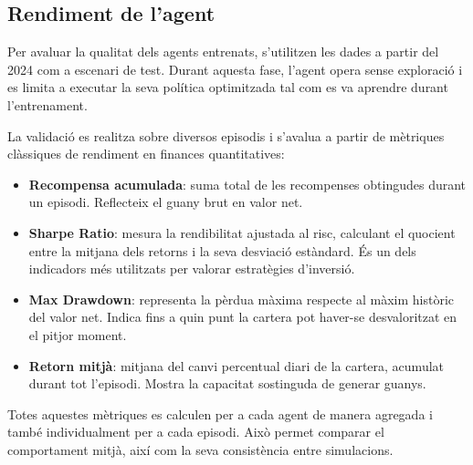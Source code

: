 \documentclass[12pt,a4paper,twoside]{book}
\begin{document}
\subsection{Rendiment de l'agent}

Per avaluar la qualitat dels agents entrenats, s'utilitzen les dades a partir del 2024 com a escenari de test. Durant aquesta fase, l'agent opera sense exploració i es limita a executar la seva política optimitzada tal com es va aprendre durant l'entrenament.

La validació es realitza sobre diversos episodis i s'avalua a partir de mètriques clàssiques de rendiment en finances quantitatives:

\begin{itemize}
    \item \textbf{Recompensa acumulada}: suma total de les recompenses obtingudes durant un episodi. Reflecteix el guany brut en valor net.

    \item \textbf{Sharpe Ratio}: mesura la rendibilitat ajustada al risc, calculant el quocient entre la mitjana dels retorns i la seva desviació estàndard. És un dels indicadors més utilitzats per valorar estratègies d'inversió.

    \item \textbf{Max Drawdown}: representa la pèrdua màxima respecte al màxim històric del valor net. Indica fins a quin punt la cartera pot haver-se desvaloritzat en el pitjor moment.

    \item \textbf{Retorn mitjà}: mitjana del canvi percentual diari de la cartera, acumulat durant tot l'episodi. Mostra la capacitat sostinguda de generar guanys.
\end{itemize}

Totes aquestes mètriques es calculen per a cada agent de manera agregada i també individualment per a cada episodi. Això permet comparar el comportament mitjà, així com la seva consistència entre simulacions.
\end{document}
